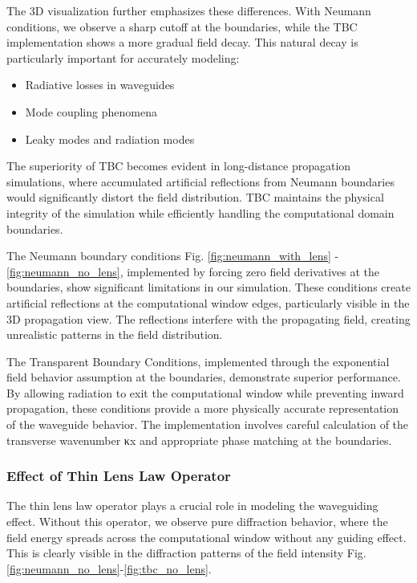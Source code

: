 \documentclass{article}
\begin{document}
The 3D visualization further emphasizes these differences. With Neumann conditions, we observe a sharp cutoff at the boundaries, while the TBC implementation shows a more gradual field decay. This natural decay is particularly important for accurately modeling:
\begin{itemize}
    \item Radiative losses in waveguides
    \item Mode coupling phenomena
    \item Leaky modes and radiation modes
\end{itemize}

The superiority of TBC becomes evident in long-distance propagation simulations, where accumulated artificial reflections from Neumann boundaries would significantly distort the field distribution. TBC maintains the physical integrity of the simulation while efficiently handling the computational domain boundaries.





The Neumann boundary conditions Fig. \ref{fig:neumann_with_lens} - \ref{fig:neumann_no_lens}, implemented by forcing zero field derivatives at the boundaries, show significant limitations in our simulation. These conditions create artificial reflections at the computational window edges, particularly visible in the 3D propagation view. The reflections interfere with the propagating field, creating unrealistic patterns in the field distribution.

The Transparent Boundary Conditions, implemented through the exponential field behavior assumption at the boundaries, demonstrate superior performance. By allowing radiation to exit the computational window while preventing inward propagation, these conditions provide a more physically accurate representation of the waveguide behavior. The implementation involves careful calculation of the transverse wavenumber κx and appropriate phase matching at the boundaries.

\subsubsection{Effect of Thin Lens Law Operator}
The thin lens law operator plays a crucial role in modeling the waveguiding effect. Without this operator, we observe pure diffraction behavior, where the field energy spreads across the computational window without any guiding effect. This is clearly visible in the diffraction patterns of the field intensity Fig. \ref{fig:neumann_no_lens}-\ref{fig:tbc_no_lens}.
\end{document}
